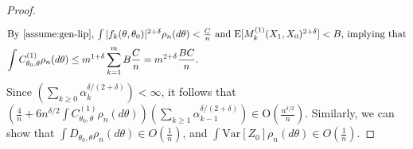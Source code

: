\documentclass[11pt]{amsart}
\newcommand{\E}{\mathrm{E}}
\newcommand{\Var}{\mathrm{Var}}
\begin{document}
\begin{proof}
\begin{align*}
    \intertext{By \Cref{assume:gen-lip}, $\int |f_k(\theta,\theta_0)|^{2+\delta}\rho_n(d\theta)<\frac{C}{n}$ and $\E [ M^{(1)}_k(X_1,X_0)^{2+\delta}]<B$, implying that}
     \int C_{\theta_0,\theta}^{(1)}\rho_n (d\theta)  & \leq m^{1+\delta}\sum_{k=1}^m B\frac{C}{n} = m^{2+\delta}\frac{BC}{n}.
\end{align*}
Since $\left(\sum_{k\geq 0}\alpha_{k}^{\delta/(2+\delta)}\right)<\infty$, %
it follows that
    $\left(\frac{4}{n}+6n^{\delta/2}\int C_{\theta_0,\theta}^{(1)}\rho_n(d\theta)\right)  \left(\sum_{k\geq 1}\alpha_{k-1}^{\delta/(2+\delta)}\right)\in \mathrm{O}(\frac{n^{\delta/2}}{n})$.
\sloppy Similarly, we can show that %
$\int D_{\theta_0,\theta}\rho_n (d\theta) \in O(\frac{1}{n})$, and $\int \Var[Z_0] \rho_n(d\theta) \in O(\frac{1}{n})$.


\end{proof}
\end{document}
